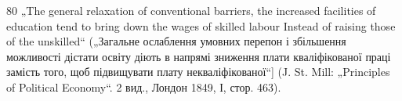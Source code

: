 80 „The general relaxation of conventional barriers, the increased facilities of education
tend to bring down the wages of skilled labour Instead of raising those of
the unskilled“ („Загальне ослаблення умовних перепон і збільшення можливості
дістати освіту діють в напрямі зниження плати кваліфікованої праці замість
того, щоб підвищувати плату некваліфікованої“] (J. St. Mill: „Principles of Political
Economy“. 2 вид., Лондон 1849, І, стор. 463).
